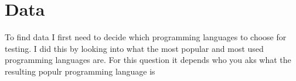 \chapter{Data}
\label{ch:data}

To find data I first need to decide which programming languages to choose for testing. I did this by looking into what the most popular and most used programming languages are. For this question it depends who you aks what the resulting populr programming language is